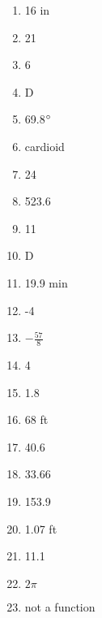 \documentclass[../uilmath.tex]{subfiles}
\begin{document}
\begin{enumerate}[label=\bfseries\arabic*.]
    \item %
    16 in 

    \item %
    21

    \item %
    6

    \item %
    D 

    \item %
    69.8$\degree$

    \item %
    cardioid 

    \item %
    24

    \item %
    523.6

    \item %
    11

    \item %
    D 

    \item %
    19.9 min 

    \item %
    -4

    \item %
    $-\frac{57}{8}$

    \item %
    4

    \item %
    1.8

    \item %
    68 ft 

    \item %
    40.6

    \item %
    33.66

    \item %
    153.9

    \item %
    1.07 ft 

    \item %
    11.1

    \item %
    $2\pi$

    \item %
    not a function 


\end{enumerate}
\end{document}
